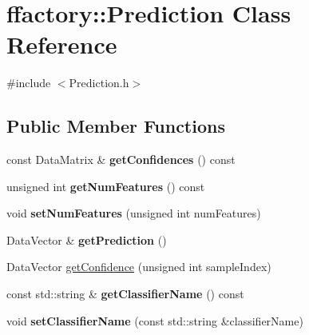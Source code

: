 \hypertarget{classffactory_1_1_prediction}{\section{ffactory\-:\-:Prediction Class Reference}
\label{classffactory_1_1_prediction}
}


{\ttfamily \#include $<$Prediction.\-h$>$}

\subsection*{Public Member Functions}
\begin{DoxyCompactItemize}
\item 
\hypertarget{classffactory_1_1_prediction_a8f50b9f580626569d44763b2d932d695}{const Data\-Matrix \& {\bfseries get\-Confidences} () const }\label{classffactory_1_1_prediction_a8f50b9f580626569d44763b2d932d695}

\item 
\hypertarget{classffactory_1_1_prediction_a04286e7cee5065b779645e4efa2a8931}{unsigned int {\bfseries get\-Num\-Features} () const }\label{classffactory_1_1_prediction_a04286e7cee5065b779645e4efa2a8931}

\item 
\hypertarget{classffactory_1_1_prediction_af923d2726316dbf7122df1ae20e3706f}{void {\bfseries set\-Num\-Features} (unsigned int num\-Features)}\label{classffactory_1_1_prediction_af923d2726316dbf7122df1ae20e3706f}

\item 
\hypertarget{classffactory_1_1_prediction_af6ce28386b271bb595571e2c59cbe67d}{Data\-Vector \& {\bfseries get\-Prediction} ()}\label{classffactory_1_1_prediction_af6ce28386b271bb595571e2c59cbe67d}

\item 
Data\-Vector \hyperlink{classffactory_1_1_prediction_ac7b95c2dacb142a3f646dfc9a0395f1d}{get\-Confidence} (unsigned int sample\-Index)
\item 
\hypertarget{classffactory_1_1_prediction_a92f72561a44ecf465897aae170e23992}{const std\-::string \& {\bfseries get\-Classifier\-Name} () const }\label{classffactory_1_1_prediction_a92f72561a44ecf465897aae170e23992}

\item 
\hypertarget{classffactory_1_1_prediction_a7435bbe5143865e1e5e5023604ddca42}{void {\bfseries set\-Classifier\-Name} (const std\-::string \&classifier\-Name)}\label{classffactory_1_1_prediction_a7435bbe5143865e1e5e5023604ddca42}


\end{DoxyCompactItemize}
